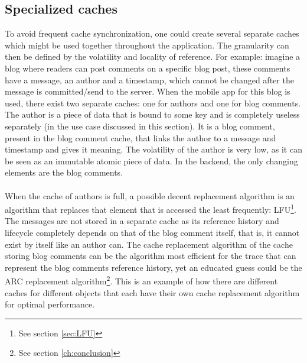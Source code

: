 \documentclass[pdftex,a4paper,12pt,twoside]{report}
\begin{document}
\subsection{Specialized caches}
To avoid frequent cache synchronization, one could create several separate caches which might be used together throughout the application. The granularity can then be defined by the volatility and locality of reference. For example: imagine a blog where readers can post comments on a specific blog post, these comments have a message, an author and a timestamp, which cannot be changed after the message is committed/send to the server. When the mobile app for this blog is used, there exist two separate caches: one for authors and one for blog comments. The author is a piece of data that is bound to some key and is completely useless separately (in the use case discussed in this section). It is a blog comment, present in the blog comment cache, that links the author to a message and timestamp and gives it meaning. The volatility of the author is very low, as it can be seen as an immutable atomic piece of data. In the backend, the only changing elements are the blog comments.
\\\\
When the cache of authors is full, a possible decent replacement algorithm is an algorithm that replaces that element that is accessed the least frequently: LFU\footnote{See section \ref{sec:LFU}}. The messages are not stored in a separate cache as its reference history and lifecycle completely depends on that of the blog comment itself, that is, it cannot exist by itself like an author can. The cache replacement algorithm of the cache storing blog comments can be the algorithm most efficient for the trace that can represent the blog comments reference history, yet an educated guess could be the ARC replacement algorithm\footnote{See section \ref{ch:conclusion}}.
This is an example of how there are different caches for different objects that each have their own cache replacement algorithm for optimal performance.
\end{document}
